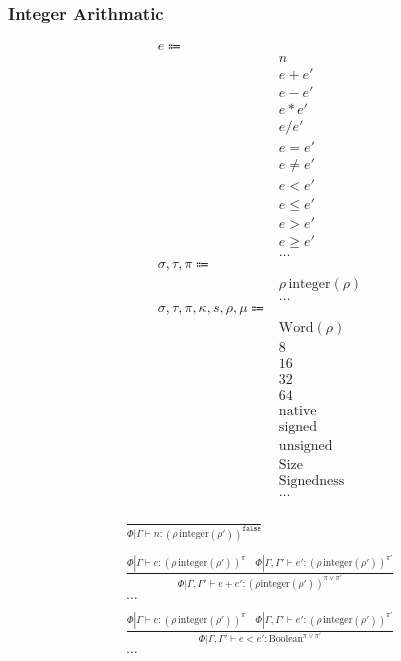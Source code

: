 \documentclass {article}
\begin{document}
\subsubsection{Integer Arithmatic}
\begin{align*}
e \Coloneqq & \\
& n \tag{Numeric Literal} \\
& e + e' \tag{Addition} \\
& e - e' \tag{Subtraction} \\
& e * e' \tag{Multiplication} \\
& e / e' \tag{Division} \\
& e = e' \tag {Equality} \\
& e \neq e' \tag {Inequality} \\
& e < e' \tag {Less Then} \\
& e \leq e' \tag {Less Then Equal} \\
& e > e' \tag {Greater Then} \\
& e \geq e' \tag {Greater Then Equal} \\
& \dots \\
\sigma, \tau, \pi \Coloneqq & \\
& \rho \, \text{integer}(\rho) \tag{Number} \\
& \dots \\
\sigma, \tau, \pi, \kappa, s, \rho, \mu \Coloneqq & \\
& \text{Word} (\rho) \tag{Word Representation} \\
& 8 \tag{Byte Size} \\
& 16 \tag{Short Size} \\
& 32 \tag{Int Size} \\
& 64 \tag{Long Size} \\
& \text{native} \tag{Native Size} \\
& \text{signed} \tag{Signed} \\
& \text{unsigned} \tag{Unsigned} \\
& \text{Size} \tag{Size Sort}\\
& \text{Signedness} \tag{Signedness Sort}\\
& \dots \\
\end{align*}

\begin{gather*}
\frac
{}
{\Phi | \Gamma \vdash n : (\rho \, \text{integer}(\rho'))^\texttt{false}} \\
\\
\frac
{\Phi | \Gamma \vdash e : (\rho \, \text{integer}(\rho'))^\pi \quad \Phi | \Gamma, \Gamma' \vdash e' : (\rho \, \text{integer}(\rho'))^{\pi'}}
{\Phi | \Gamma, \Gamma' \vdash e + e' : (\rho \text{integer}(\rho'))^{\pi \lor \pi'}} \\
\dots \\
\\
\frac
{\Phi | \Gamma \vdash e : (\rho \, \text{integer}(\rho'))^\pi \quad \Phi | \Gamma, \Gamma' \vdash e' : (\rho \, \text{integer}(\rho'))^{\pi'}}
{\Phi | \Gamma, \Gamma' \vdash e < e' : \text{Boolean}^{\pi \lor \pi'}} \\
\dots
\end{gather*}
\end{document}
